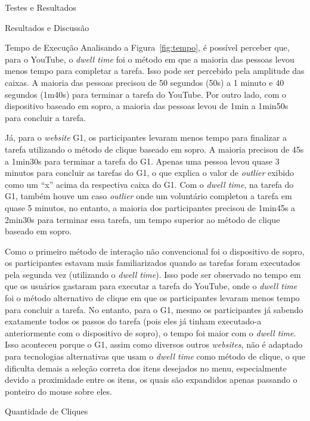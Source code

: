 \begin{chapter}{Testes e Resultados}
\begin{section}{Resultados e Discussão}
\begin{subsection}{Tempo de Execução}
Analisando a Figura~\ref{fig:tempo}, é possível perceber que, para o YouTube, o
\textit{dwell time} foi o método em que a maioria das pessoas levou menos tempo
para completar a tarefa. Isso pode ser percebido pela amplitude das caixas.
A maioria das pessoas precisou de 50 segundos (50s) a 1 minuto e 40 segundos
(1m40s) para terminar a tarefa do YouTube. Por outro lado, com o dispositivo
baseado em sopro, a maioria das pessoas levou de 1min a 1min50s para concluir a
tarefa.

Já, para o \textit{website} G1, os participantes levaram menos tempo
para finalizar a tarefa utilizando o método de clique baseado em sopro.
A maioria precisou de 45s a 1min30s para terminar a tarefa do G1. Apenas uma
pessoa levou quase 3 minutos para concluir as tarefas do G1, o que explica o
valor de \textit{outlier} exibido como um ``x'' acima da respectiva caixa do
G1. Com o \textit{dwell time}, na tarefa do G1, também houve um caso
\textit{outlier} onde um voluntário completou a tarefa em quase 5 minutos, no
entanto, a maioria dos participantes precisou de 1min45s a 2min30s para terminar
essa tarefa, um tempo superior ao método de clique baseado em sopro.

Como o primeiro método de interação não convencional foi o dispositivo de sopro,
os participantes estavam mais familiarizados quando as tarefas foram executados
pela segunda vez (utilizando o \textit{dwell time}). Isso pode ser observado no
tempo em que os usuários gastaram para executar a tarefa do YouTube, onde o
\textit{dwell time} foi o método alternativo de clique em que  os participantes
levaram menos tempo para concluir a tarefa. No entanto, para o G1, mesmo os
participantes já sabendo exatamente todos os passos do tarefa (pois eles já
tinham executado-a anteriormente com o dispositivo de sopro), o tempo foi maior
com o \textit{dwell time}. Isso aconteceu porque o G1, assim como diversos
outros \textit{websites}, não é adaptado para tecnologias alternativas que usam
o \textit{dwell time} como método de clique, o que dificulta demais a seleção
correta dos itens desejados no menu, especialmente devido a proximidade entre os
itens, os quais são expandidos apenas passando o ponteiro do mouse sobre eles.

\end{subsection}

\begin{subsection}{Quantidade de Cliques}


\end{subsection}
\end{section}
\end{chapter}
